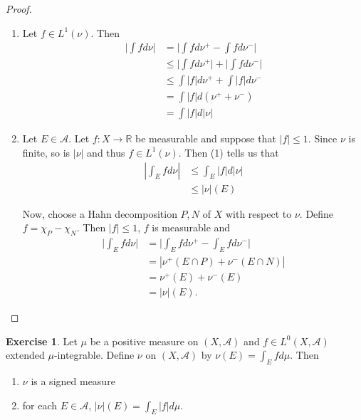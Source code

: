 \documentclass[12pt]{amsart}
\theoremstyle{definition}
\newtheorem{ex}[definition]{Exercise}
\newcommand{\R}{\mathbb{R}}
\newcommand{\MA}{\mathcal{A}}
\begin{document}
	\begin{proof}
		\begin{enumerate}
			\item Let $f \in L^1(\nu)$. Then 
			\begin{align*}
				\bigg|\int f d \nu \bigg| 
				&= \bigg|\int f d \nu^+ - \int f d \nu^-\bigg|\\
				& \leq \bigg|\int f d \nu^+\bigg| + \bigg|\int f d \nu^-\bigg|\\
				& \leq \int |f| d\nu^+ + \int |f| d\nu^-\\
				&= \int |f| d (\nu^+ + \nu^-)\\
				&= \int |f| d |\nu|
			\end{align*}
			
			\item Let $E \in \MA$. Let $f:X \rightarrow \R$ be measurable and suppose that $|f| \leq 1$. Since $\nu$ is finite, so is $|\nu|$ and thus $f \in L^1(\nu)$. Then (1) tells us that 
			\begin{align*}
				|\int_E f d \nu| 
				& \leq \int_E |f| d |\nu|\\
				& \leq |\nu|(E) 
			\end{align*}
			
			Now, choose a Hahn decomposition $P,N$ of $X$ with respect to $\nu$. Define $f = \chi_{P} - \chi_{N}$. Then $|f| \leq 1$, $f$ is measurable and 
			\begin{align*}
				\bigg|\int_E f d\nu\bigg|
				&= \bigg|\int_E f d \nu^+ - \int_E f d \nu^-\bigg|\\
				&= | \nu^+(E \cap P) + \nu^-(E \cap N)|\\
				&= \nu^+(E) + \nu^-(E)\\
				&= |\nu|(E).
			\end{align*}
			
		\end{enumerate}
	\end{proof}
	
	\begin{ex}
		Let $\mu$ be a positive measure on $(X, \MA)$ and $f \in L^0(X, \MA)$ extended $\mu$-integrable. Define $\nu$ on $(X, \MA)$ by $\nu(E) = \int_E f d \mu$. Then
		\begin{enumerate}
			\item $\nu$ is a signed measure
			\item for each $E\in \MA$, $|\nu|(E) = \int_E|f|d\mu$.
		\end{enumerate} 
	\end{ex}
	
\end{document}
